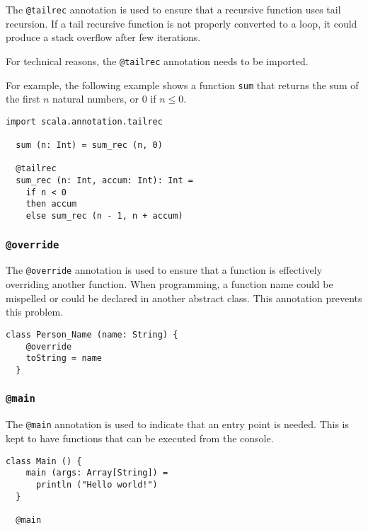 \documentclass[12pt,a4paper]{book}
\makeatletter
\newcommand{\srccode}[1]{\texttt{{#1}}}
\newcommand{\annotation}[1]{{\color{brown}\srccode{#1}}\xspace}
\newcommand{\stailrec}{\annotation{@tailrec}}
\newcommand{\soverride}{\annotation{@override}}
\newcommand{\smain}{\annotation{@main}}
\makeatother
\begin{document}
    The \stailrec annotation is used to ensure that a recursive function uses tail recursion.
    If a tail recursive function is not properly converted to a loop, it could produce a stack overflow after few iterations.

    For technical reasons, the \stailrec annotation needs to be imported.

    For example, the following example shows a function \srccode{sum} that returns the sum of the first $n$ natural numbers, or 0 if $n \leq 0$.

    \begin{lstlisting}[label={lst:exampleTailrec}]
  import scala.annotation.tailrec

  sum (n: Int) = sum_rec (n, 0)

  @tailrec
  sum_rec (n: Int, accum: Int): Int =
    if n < 0
    then accum
    else sum_rec (n - 1, n + accum)

    \end{lstlisting}

    \subsubsection{\soverride}

    The \soverride annotation is used to ensure that a function is effectively overriding another function.
    When programming, a function name could be mispelled or could be declared in another abstract class.
    This annotation prevents this problem.

    \begin{lstlisting}[label={lst:exampleOverride}]
  class Person_Name (name: String) {
    @override
    toString = name
  }
    \end{lstlisting}

    \subsubsection{\smain}

    The \smain annotation is used to indicate that an entry point is needed.
    This is kept to have functions that can be executed from the console.

    \begin{lstlisting}[label={lst:exampleMain}]
  class Main () {
    main (args: Array[String]) =
      println ("Hello world!")
  }

  @main
    \end{lstlisting}
\end{document}

